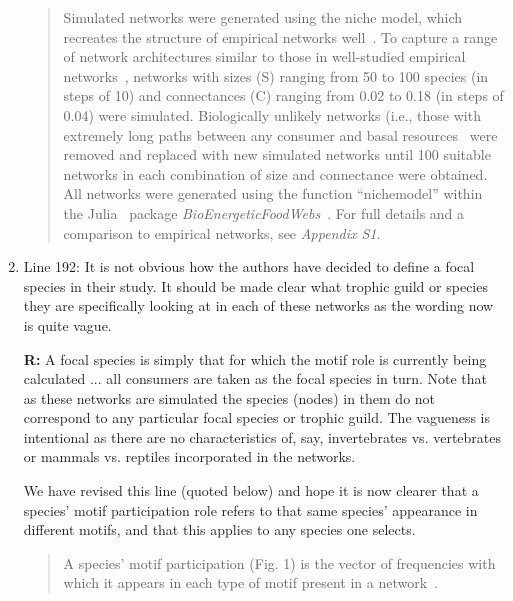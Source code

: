 \documentclass[12pt]{article}
\begin{document}
\begin{enumerate}
                \begin{quotation}
                Simulated networks were generated using the niche model, which recreates the structure of empirical networks well~\citep{Williams2000,Stouffer2007}.
                To capture a range of network architectures similar to those in well-studied empirical networks~\citep{Dunne2002,Dunne2002e}, networks with sizes (S) ranging from 50 to 100 species (in steps of 10) and connectances (C) ranging from 0.02 to 0.18 (in steps of 0.04) were simulated. 
                Biologically unlikely networks (i.e., those with extremely long paths between any consumer and basal resources~\citep{Borrelli2014} were removed and replaced with new simulated networks until 100 suitable networks in each combination of size and connectance were obtained.
                All networks were generated using the function ``nichemodel'' within the Julia~\citep{Bezanson2017julia} package \emph{BioEnergeticFoodWebs}~\citep{bioenergfw,Delmas2017}.     
                For full details and a comparison to empirical networks, see \emph{Appendix S1}.
                \end{quotation}


            \item Line 192: It is not obvious how the authors have decided to define a focal species in their study. It should be made clear what trophic guild or species they are specifically looking at in each of these networks as the wording now is quite vague.

                \textbf{R:} A focal species is simply that for which the motif role is currently being calculated ... all consumers are taken as the focal species in turn. Note that as these networks are simulated the species (nodes) in them do not correspond to any particular focal species or trophic guild. The vagueness is intentional as there are no characteristics of, say, invertebrates vs. vertebrates or mammals vs. reptiles incorporated in the networks. 

                We have revised this line (quoted below) and hope it is now clearer that a species' motif participation role refers to that same species' appearance in different motifs, and that this applies to any species one selects.
                \begin{quotation}
                A species' motif participation (Fig. 1) is the vector of frequencies with which it appears in each type of motif present in a network~\citep{Stouffer2012}.
                \end{quotation}



\end{enumerate}
\end{document}
